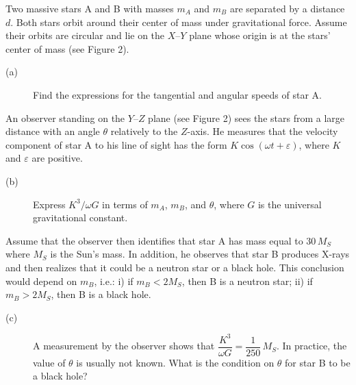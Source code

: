 Two massive stars A and B with masses $m_A$ and $m_B$ are separated by a
distance $d$. Both stars orbit around their center of mass under
gravitational force. Assume their orbits are circular and lie on the
$X$--$Y$ plane whose origin is at the stars' center of mass (see Figure 2).

\begin{description}
\item[(a)] Find the expressions for the tangential and angular speeds of
  star A.
\end{description}

An observer standing on the $Y$--$Z$ plane (see Figure 2) sees the stars from
a large distance with an angle $\theta$ relatively to the $Z$-axis. He
measures that the velocity component of star A to his line of sight has the
form $K\cos(\omega t + \varepsilon)$, where $K$ and $\varepsilon$ are
positive.

\begin{description}
\item[(b)] Express $K^3/\omega G$ in terms of $m_A$, $m_B$, and $\theta$,
  where $G$ is the universal gravitational constant.
\end{description}

Assume that the observer then identifies that star A has mass equal to
$30\,M_S$ where $M_S$ is the Sun's mass. In addition, he observes that star B
produces X-rays and then realizes that it could be a neutron star or a black
hole. This conclusion would depend on $m_B$, i.e.: i) if $m_B < 2M_S$, then B
is a neutron star; ii) if $m_B > 2M_S$, then B is a black hole.

\begin{description}
\item[(c)] A measurement by the observer shows that
  $\dfrac{K^3}{\omega G} = \dfrac{1}{250}\,M_S$. In practice, the value of
  $\theta$ is usually not known. What is the condition on $\theta$ for star B
  to be a black hole?
\end{description}
